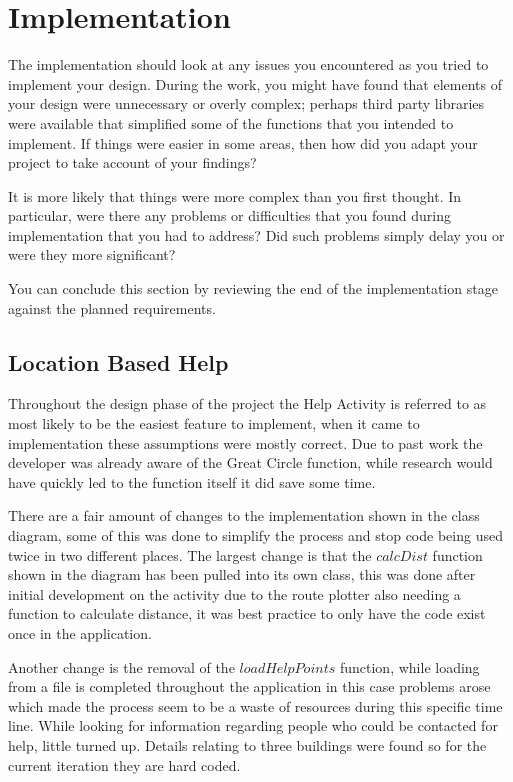 \chapter{Implementation}

The implementation should look at any issues you encountered as you tried to implement your design. During the work, you might have found that elements of your design were unnecessary or overly complex; perhaps third party libraries were available that simplified some of the functions that you intended to implement. If things were easier in some areas, then how did you adapt your project to take account of your findings?

It is more likely that things were more complex than you first thought. In particular, were there any problems or difficulties that you found during implementation that you had to address? Did such problems simply delay you or were they more significant? 

You can conclude this section by reviewing the end of the implementation stage against the planned requirements.
\section{Location Based Help}
Throughout the design phase of the project the Help Activity is referred to as most likely to be the easiest feature to implement, when it came to implementation these assumptions were mostly correct.  Due to past work the developer was already aware of the Great Circle function, while research would have quickly led to the function itself it did save some time. 

There are a fair amount of changes to the implementation shown in the class diagram, some of this was done to simplify the process and stop code being used twice in two different places. The largest change is that the $calcDist$ function shown in the diagram has been pulled into its own class, this was done after initial development on the activity due to the route plotter also needing a function to calculate distance, it was best practice to only have the code exist once in the application.

Another change is the removal of the $loadHelpPoints$ function, while loading from a file is completed throughout the application in this case problems arose which made the process seem to be a waste of resources during this specific time line. While looking for information regarding people who could be contacted for help, little turned up. Details relating to three buildings were found so for the current iteration they are hard coded. 

